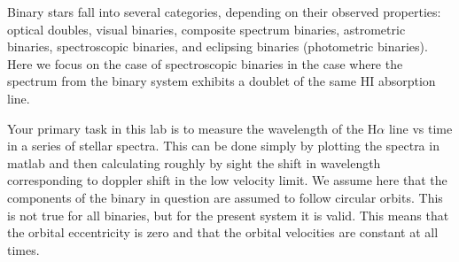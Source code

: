 \documentclass[11pt]{article}
\begin{document}
Binary stars fall into several categories, depending on their observed properties: optical doubles, visual binaries, composite spectrum binaries, astrometric binaries, spectroscopic binaries, and eclipsing binaries (photometric binaries). Here we focus on the case of spectroscopic binaries in the case where the spectrum from the binary system exhibits a doublet of the same HI absorption line.

Your primary task in this lab is to measure the wavelength of the H$\alpha$ line vs time in a series of stellar spectra. This can be done simply by plotting the spectra in matlab and then calculating roughly by sight the shift in wavelength corresponding to doppler shift in the low velocity limit. We assume here that the components of the binary in question are assumed to follow circular orbits. This is not true for all binaries, but for the present system it is valid. This means that the orbital eccentricity is zero and that the orbital velocities are constant at all times.
	
\end{document}
